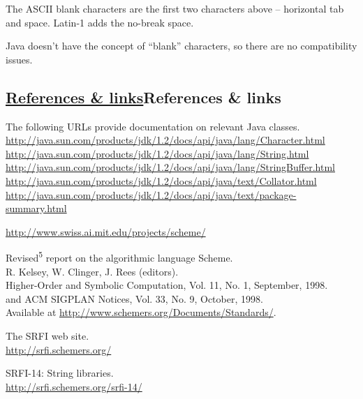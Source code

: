 The ASCII blank characters are the first two characters above --
horizontal tab and space. Latin-1 adds the no-break space.

Java doesn't have the concept of ``blank'' characters, so there are no
compatibility issues.


\subsection{{\href{}{References \&
links}}{References \& links}}\label{references-links}

\begin{description}
\tightlist
\item[\textbf{\href{}{{[}Java{]}}} ]
The following URLs provide documentation on relevant Java classes.\\
\url{http://java.sun.com/products/jdk/1.2/docs/api/java/lang/Character.html}\\
\url{http://java.sun.com/products/jdk/1.2/docs/api/java/lang/String.html}\\
\url{http://java.sun.com/products/jdk/1.2/docs/api/java/lang/StringBuffer.html}\\
\url{http://java.sun.com/products/jdk/1.2/docs/api/java/text/Collator.html}\\
\url{http://java.sun.com/products/jdk/1.2/docs/api/java/text/package-summary.html}
\item[\textbf{\href{}{{[}MIT-Scheme{]}}} ]
\url{http://www.swiss.ai.mit.edu/projects/scheme/}
\item[\textbf{\href{}{{[}R5RS{]}}}]
Revised\textsuperscript{5} report on the algorithmic language Scheme.\\
R. Kelsey, W. Clinger, J. Rees (editors).\\
Higher-Order and Symbolic Computation, Vol. 11, No. 1, September,
1998.\\
and ACM SIGPLAN Notices, Vol. 33, No. 9, October, 1998.\\
Available at \url{http://www.schemers.org/Documents/Standards/}.
\item[\textbf{{[}SRFI{]}}]
The SRFI web site.\\
\url{http://srfi.schemers.org/}
\item[\textbf{{[}SRFI-14{]}}]
SRFI-14: String libraries.\\
\url{http://srfi.schemers.org/srfi-14/}


\end{description}
